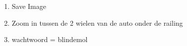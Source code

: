 \begin{enumerate}
  \item Save Image
  \item Zoom in tussen de 2 wielen van de auto onder de railing
  \item wachtwoord = blindemol
\end{enumerate}